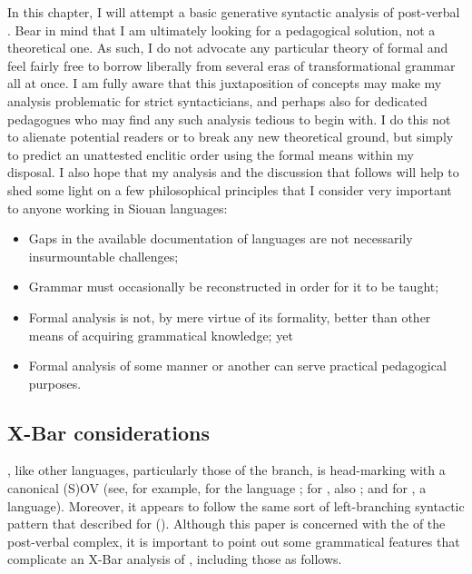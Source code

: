 \documentclass[output=paper]{LSP/langsci}
\begin{document}
In this chapter, I will attempt a basic generative syntactic analysis of  post-verbal . Bear in mind that I am ultimately looking for a pedagogical solution, not a theoretical one. As such, I do not advocate any particular theory of formal  and feel fairly free to borrow liberally from several eras of transformational grammar all at once. I am fully aware that this juxtaposition of concepts may make my analysis problematic for strict syntacticians, and perhaps also for dedicated pedagogues who may find any such analysis tedious to begin with. I do this not to alienate potential readers or to break any new theoretical ground, but simply to predict an unattested enclitic order using the formal means within my disposal. I also hope that my analysis and the discussion that follows will help to shed some light on a few philosophical principles that I consider very important to anyone working in Siouan languages:

\begin{itemize}
\item Gaps in the available documentation of languages are not necessarily insurmountable challenges;
\item Grammar must occasionally be reconstructed in order for it to be taught;
\item Formal analysis is not, by mere virtue of its formality, better than other means of acquiring grammatical knowledge; yet
\item Formal analysis of some manner or another can serve practical pedagogical purposes.
\end{itemize}

\subsection{X-Bar considerations}
, like other  languages, particularly those of the  branch, is head-marking with a canonical (S)OV  (see, for example, \citet[421]{Quintero2004} for the  language ; \citet[488--490]{Rankin2005b} for , also ; and \citet[369]{Cumberland2005} for , a  language). Moreover, it appears to follow the same sort of left-branching syntactic pattern that \citet{Boyle2007} described for  (). Although this paper is concerned with the  of the  post-verbal complex, it is important to point out some grammatical features that complicate an X-Bar analysis of , including those as follows.
\end{document}
